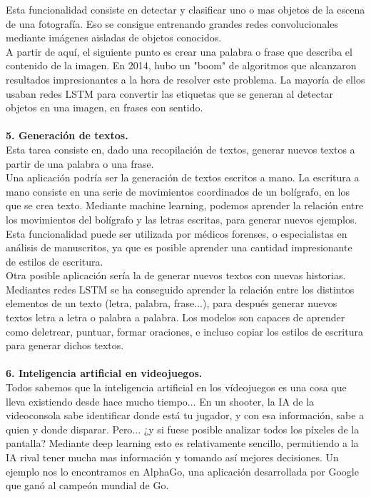 Esta funcionalidad consiste en detectar y clasificar uno o mas objetos de la escena de una fotografía. Eso se consigue entrenando grandes redes convolucionales mediante imágenes aisladas de objetos conocidos.\\
A partir de aquí, el siguiente punto es crear una palabra o frase que describa el contenido de la imagen. En 2014, hubo un "boom" de algoritmos que alcanzaron resultados impresionantes a la hora de resolver este problema. La mayoría de ellos usaban redes LSTM para convertir las etiquetas que se generan al detectar objetos en una imagen, en frases con sentido.\\
\\\textbf{5. Generación de textos.}\\
Esta tarea consiste en, dado una recopilación de textos, generar nuevos textos a partir de una palabra o una frase.\\
Una aplicación podría ser la generación de textos escritos a mano. La escritura a mano consiste en una serie de movimientos coordinados de un bolígrafo, en los que se crea texto. Mediante machine learning, podemos aprender la relación entre los movimientos del bolígrafo y las letras escritas, para generar nuevos ejemplos. Esta funcionalidad puede ser utilizada por médicos forenses, o especialistas en análisis de manuscritos, ya que es posible aprender una cantidad impresionante de estilos de escritura.\\
Otra posible aplicación sería la de generar nuevos textos con nuevas historias. Mediantes redes LSTM se ha conseguido aprender la relación entre los distintos elementos de un texto (letra, palabra, frase...), para después generar nuevos textos letra a letra o palabra a palabra. Los modelos son capaces de aprender como deletrear, puntuar, formar oraciones, e incluso copiar los estilos de escritura para generar dichos textos.\\
\\\textbf{6. Inteligencia artificial en videojuegos.}\\
Todos sabemos que la inteligencia artificial en los vídeojuegos es una cosa que lleva existiendo desde hace mucho tiempo... En un shooter, la IA de la videoconsola sabe identificar donde está tu jugador, y con esa información, sabe a quien y donde disparar. Pero... ¿y si fuese posible analizar todos los píxeles de la pantalla? Mediante deep learning esto es relativamente sencillo, permitiendo a la IA rival tener mucha mas información y tomando así mejores decisiones. Un ejemplo nos lo encontramos en AlphaGo, una aplicación desarrollada por Google que ganó al campeón mundial de Go.\\\\

